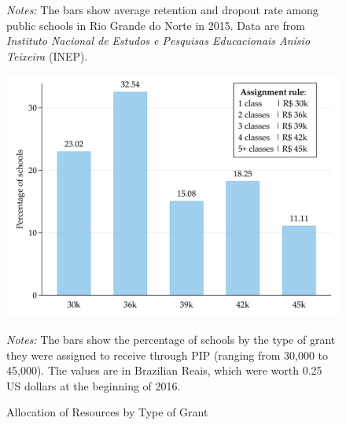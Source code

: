 \documentclass[11pt,a4paper]{article}
\begin{document}
\begin{figure}[htbp]
    \begin{minipage}{0.8\textwidth}
        \small{\textit{Notes:} The bars show average retention and dropout rate among public schools in Rio Grande do Norte in 2015. Data are from \textit{Instituto Nacional de Estudos e Pesquisas Educacionais Anísio Teixeira} (INEP).}
    \end{minipage}
\end{figure}
%

\begin{figure}[htbp]
    \caption{Allocation of Resources by Type of Grant}
    \label{fig:grant}
    \centering
    
    \includegraphics[width=13cm]{DataWork/Output/Figures/figA3-grant.png}
    
    \begin{minipage}{0.8\textwidth}
        \small{\textit{Notes:} The bars show the percentage of schools by the type of grant they were assigned to receive through PIP (ranging from 30,000 to 45,000). The values are in Brazilian Reais, which were worth 0.25 US dollars at the beginning of 2016.}
    \end{minipage}
    
\end{figure}
%
\end{document}
